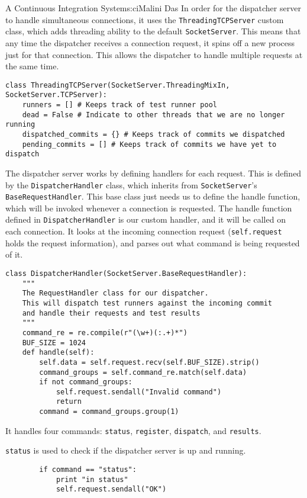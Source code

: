 \begin{aosachapter}{A Continuous Integration System}{s:ci}{Malini Das}
In order for the dispatcher server to handle simultaneous connections,
it uses the \texttt{ThreadingTCPServer} custom class, which adds
threading ability to the default \texttt{SocketServer}. This means that
any time the dispatcher receives a connection request, it spins off a
new process just for that connection. This allows the dispatcher to
handle multiple requests at the same time.

\begin{verbatim}
class ThreadingTCPServer(SocketServer.ThreadingMixIn, SocketServer.TCPServer):
    runners = [] # Keeps track of test runner pool
    dead = False # Indicate to other threads that we are no longer running
    dispatched_commits = {} # Keeps track of commits we dispatched
    pending_commits = [] # Keeps track of commits we have yet to dispatch
\end{verbatim}

The dispatcher server works by defining handlers for each request. This
is defined by the \texttt{DispatcherHandler} class, which inherits from
\texttt{SocketServer}'s \texttt{BaseRequestHandler}. This base class
just needs us to define the handle function, which will be invoked
whenever a connection is requested. The handle function defined in
\texttt{DispatcherHandler} is our custom handler, and it will be called
on each connection. It looks at the incoming connection request
(\texttt{self.request} holds the request information), and parses out
what command is being requested of it.

\begin{verbatim}
class DispatcherHandler(SocketServer.BaseRequestHandler):
    """
    The RequestHandler class for our dispatcher.
    This will dispatch test runners against the incoming commit
    and handle their requests and test results
    """
    command_re = re.compile(r"(\w+)(:.+)*")
    BUF_SIZE = 1024
    def handle(self):
        self.data = self.request.recv(self.BUF_SIZE).strip()
        command_groups = self.command_re.match(self.data)
        if not command_groups:
            self.request.sendall("Invalid command")
            return
        command = command_groups.group(1)
\end{verbatim}

It handles four commands: \texttt{status}, \texttt{register},
\texttt{dispatch}, and \texttt{results}.

\texttt{status} is used to check if the dispatcher server is up and
running.

\begin{verbatim}
        if command == "status":
            print "in status"
            self.request.sendall("OK")
\end{verbatim}


\end{aosachapter}
